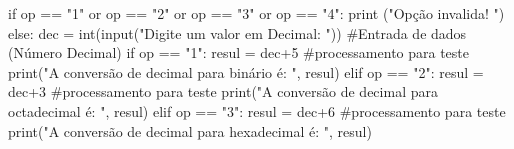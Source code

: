 if op == "1" or op == "2" or op == "3" or op == "4":
    print ("Opção invalida! ")
else:
    dec = int(input("Digite um valor em Decimal: ")) #Entrada de dados (Número Decimal)
    if op == "1":
       resul = dec+5                            #processamento para teste
       print("A conversão de decimal para binário é: ", resul)
    elif op == "2":
         resul = dec+3                          #processamento para teste
         print("A conversão de decimal para octadecimal é: ", resul)
    elif op == "3":
         resul = dec+6                          #processamento para teste
         print("A conversão de decimal para hexadecimal é: ", resul)